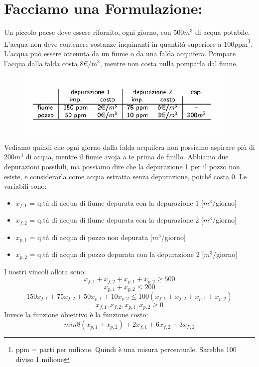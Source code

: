 \section{Facciamo una Formulazione:} Un piccolo paese deve essere rifornito, ogni giorno, con 500$m^3$ di acqua potabile. L'acqua non deve contenere sostanze inquinanti in quantità superiore a 100ppm\footnote{ppm = parti per milione. Quindi è una misura percentuale. Sarebbe 100 diviso 1 milione}. L'acqua può essere ottenuta da un fiume o da una falda acquifera. Pompare l'acqua dalla falda costa 8\euro/m$^3$, mentre non costa nulla pomparla dal fiume.
\begin{figure}[h!]
    \centering
    \includegraphics{tabella.png}
\end{figure}
Vediamo quindi che ogni giorno dalla falda acquifera non possiamo aspirare più di 200$m^3$ di acqua, mentre il fiume avoja a te prima de finillo. Abbiamo due depurazioni possibili, ma possiamo dire che la depurazione 1 per il pozzo non esiste, e considerarla come acqua estratta senza depurazione, poiché costa 0. Le variabili sono:
\begin{itemize}
    \item $x_{f,1}$ = q.tà di acqua di fiume depurata con la depurazione 1 $[m^3$/giorno]
    \item $x_{f,2}$ = q.tà di acqua di fiume depurata con la depurazione 2 $[m^3$/giorno]
    \item $x_{p,1}$ = q.tà di acqua di pozzo non depurata $[m^3$/giorno]
    \item $x_{p,2}$ = q.tà di acqua di pozzo depurata con la depurazione 2 [$m^3$/giorno]
\end{itemize}
I nostri vincoli allora sono;
\begin{equation*}
    x_{f,1} + x_{f,2} + x_{p,1} + x_{p,2} \geq 500
\end{equation*}
\begin{equation*}
    x_{p,1} + x_{p,2} \leq 200    
\end{equation*}
\begin{equation*}
    150x_{f,1} + 75x_{f,2} + 50x_{p,1} + 10x_{p,2} \leq 100(x_{f,1} + x_{f,2} + x_{p,1} + x_{p,2})
\end{equation*}
\begin{equation*}
    x_{f,1}, x_{f,2}, x_{p,1}, x_{p,2} \geq 0
\end{equation*}
Invece la funzione obiettivo è la funzione costo:
\begin{equation*}
min 8(x_{p,1}+x_{p,2}) + 2x_{f,1} + 6x_{f,2} + 3x_{P,2} 
\end{equation*}






